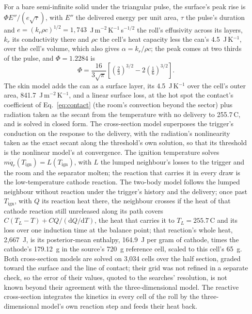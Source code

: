 \documentclass[preprint,12pt]{elsarticle}
\newcommand{\degC}{\,\textdegree C}
\begin{document}
For a bare semi-infinite solid under the triangular pulse, the surface's peak rise is $\Phi E''/(e\sqrt{\tau})$, with $E''$ the delivered energy per unit area, $\tau$ the pulse's duration and $e=(k_r\rho c)^{1/2}=1{,}743$~J\,m$^{-2}$\,K$^{-1}$\,s$^{-1/2}$ the roll's effusivity across its layers, $k_r$ its conductivity there and $\rho c$ the cell's heat capacity less the can's 4.5~J\,K$^{-1}$, over the cell's volume, which also gives $\alpha=k_r/\rho c$; the peak comes at two thirds of the pulse, and $\Phi=1.2284$ is
\begin{equation}
\Phi=\frac{16}{3\sqrt{\pi}}\left[\left(\tfrac{2}{3}\right)^{3/2}-2\left(\tfrac{1}{6}\right)^{3/2}\right].
\label{eq:phi}
\end{equation}
The skin model adds the can as a surface layer, its 4.5~J\,K$^{-1}$ over the cell's outer area, 841.7~J\,m$^{-2}$\,K$^{-1}$, and a linear surface loss, at the hot spot the contact's coefficient of Eq.~\eqref{eq:contact} (the room's convection beyond the sector) plus radiation taken as the secant from the temperature with no delivery to 255.7\degC, and is solved in closed form. The cross-section model superposes the trigger's conduction on the response to the delivery, with the radiation's nonlinearity taken as the exact secant along the threshold's own solution, so that its threshold is the nonlinear model's at convergence. The ignition temperature solves $m\dot q_r(T_\mathrm{ign})=L(T_\mathrm{ign})$, with $L$ the lumped neighbour's losses to the trigger and the room and the separator molten; the reaction that carries it in every draw is the low-temperature cathode reaction. The two-body model follows the lumped neighbour without reaction under the trigger's history and the delivery; once past $T_\mathrm{ign}$, with $Q$ its reaction heat there, the neighbour crosses if the heat of that cathode reaction still unreleased along its path covers $C(T_L-T)+CQ/(\mathrm{d}Q/\mathrm{d}T)$, the heat that carries it to $T_L=255.7$\degC{} and its loss over one induction time at the balance point; that reaction's whole heat, 2,667~J, is its posterior-mean enthalpy, 164.9~J per gram of cathode, times the cathode's 179.12~g in the source's 720~g reference cell, scaled to this cell's 65~g. Both cross-section models are solved on 3,034 cells over the half section, graded toward the surface and the line of contact; their grid was not refined in a separate check, so the error of their values, quoted to the searches' resolution, is not known beyond their agreement with the three-dimensional model. The reactive cross-section integrates the kinetics in every cell of the roll by the three-dimensional model's own reaction step and feeds their heat back.
\end{document}
